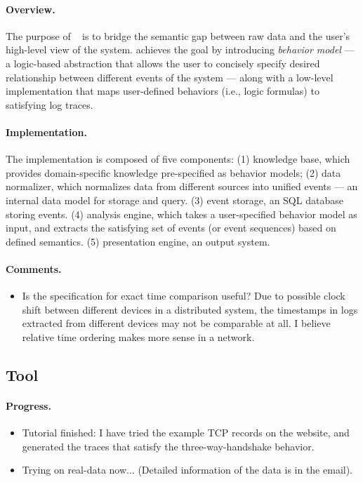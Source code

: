 \documentclass{article}
\begin{document}
\paragraph{Overview.}
The purpose of \saf{}~\cite{arun2011} is to bridge the semantic gap between raw
data and the user's high-level view of the system. \saf{} achieves the goal by
introducing {\em behavior model} --- a logic-based abstraction that allows the user to
concisely specify desired relationship between different events of the system --- along
with a low-level implementation that maps user-defined behaviors (i.e., logic
formulas) to satisfying log traces. 

\paragraph{Implementation.}
The implementation is composed of five components: 
(1) knowledge base, which provides domain-specific knowledge pre-specified as behavior
models; 
(2) data normalizer, which normalizes data from different sources into unified
events --- an internal data model for storage and query.
(3) event storage, an SQL database storing events.
(4) analysis engine, which takes a user-specified behavior model as input, and
extracts the satisfying set of events (or event sequences) based on defined
semantics.
(5) presentation engine, an output system.

\paragraph{Comments.}
\begin{itemize}
\item Is the specification for exact time comparison useful? Due to possible
  clock shift between different devices in a distributed system, the timestamps
  in logs extracted from different devices may not be comparable at all. I
  believe relative time ordering makes more sense in a network.
\end{itemize}


\subsection{\saf{} Tool}
\label{sec:saftool}

\paragraph{Progress.}

\begin{itemize}
\item Tutorial finished: I have tried the example TCP records on the \saf
  website, and generated the traces that satisfy the three-way-handshake
  behavior.
\item Trying \saf{} on real-data now... (Detailed information of the data is in
  the email).
\end{itemize}
\end{document}
